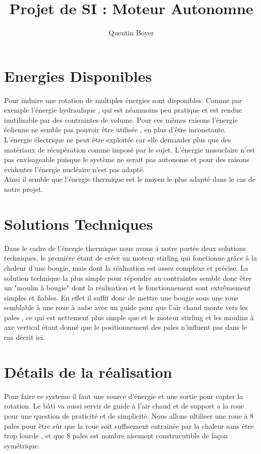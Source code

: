 \documentclass[a4paper,12pt]{article}
\title{Projet de SI : Moteur Autonomne}
\author{Quentin Boyer}
\begin{document}
\maketitle
\tableofcontents

\section{Energies Disponibles}

\indent Pour induire une rotation de multiples énergies sont disponibles. Comme par exemple l'énergie hydraulique , qui est néanmoins peu pratique et est rendue inutilisable par des contraintes de volume. Pour ces mêmes raisons l'énergie éolienne ne semble pas pouvoir être utilisée , en plus d'être inconstante.\\[0.3cm]
\indent L'énergie électrique ne peut être exploitée car elle demander plus que des matériaux de récupération comme imposé par le sujet. L'énergie musuclaire n'est pas envisageable puisque le système ne serait pas autonome et pour des raisons évidentes l'énergie nucléaire n'est pas adapté.\\[0.3cm]
\indent Ainsi il semble que l'énergie thermique est le moyen le plus adapté dans le cas de notre projet.\\[0.05cm]

\pagebreak

\section{Solutions Techniques}
Dans le cadre de l'énergie thermique nous avons à notre portée deux solutions techniques, le première étant de créer un moteur stirling qui fonctionne grâce à la chaleur d'une bougie, mais dont la réalisation est assez complexe et précise. La solution technique la plus simple pour répondre au contraintes semble donc être un "moulin à bougie" dont la réalisation et le fonctionnement sont extrêmement simples et fiables. En effet il suffit donc de mettre une bougie sous une roue semblable à une roue à aube avec un guide pour que l'air chaud monte vers les pales , ce qui est nettement plus simple que et le moteur stirling et les moulins à axe vertical étant donné que le positionnement des pales n'influent pas dans le cas décrit ici.

  \section{Détails de la réalisation}
  Pour faire ce systeme il faut une source d'énergie et une sortie pour capter la rotation. Le bâti va aussi servir de guide à l'air chaud et de support a la roue pour une question de praticité et de simplicité. Nous allons ultiliser une roue à 8 pales pour être sûr que la roue soit suffisement entrainée par la chaleur sans être trop lourde , et que 8 pales est nombre aisement construcutible de façon symétrique.
\end{document}
